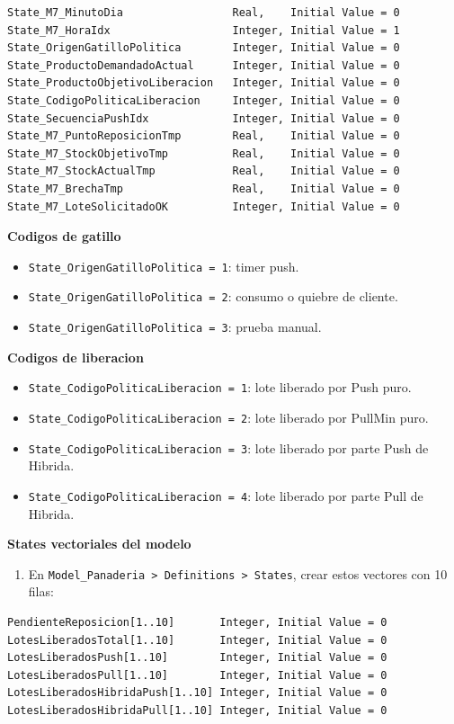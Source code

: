 \documentclass[11pt]{article}
\newcommand{\simio}[1]{\texttt{#1}}
\newcommand{\state}[1]{\texttt{#1}}
\begin{document}
\begin{lstlisting}[caption={States escalares del modelo para M7}]
State_M7_MinutoDia                 Real,    Initial Value = 0
State_M7_HoraIdx                   Integer, Initial Value = 1
State_OrigenGatilloPolitica        Integer, Initial Value = 0
State_ProductoDemandadoActual      Integer, Initial Value = 0
State_ProductoObjetivoLiberacion   Integer, Initial Value = 0
State_CodigoPoliticaLiberacion     Integer, Initial Value = 0
State_SecuenciaPushIdx             Integer, Initial Value = 0
State_M7_PuntoReposicionTmp        Real,    Initial Value = 0
State_M7_StockObjetivoTmp          Real,    Initial Value = 0
State_M7_StockActualTmp            Real,    Initial Value = 0
State_M7_BrechaTmp                 Real,    Initial Value = 0
State_M7_LoteSolicitadoOK          Integer, Initial Value = 0
\end{lstlisting}

\textbf{Codigos de gatillo}
\begin{itemize}
  \item \state{State\_OrigenGatilloPolitica = 1}: timer push.
  \item \state{State\_OrigenGatilloPolitica = 2}: consumo o quiebre de cliente.
  \item \state{State\_OrigenGatilloPolitica = 3}: prueba manual.
\end{itemize}

\textbf{Codigos de liberacion}
\begin{itemize}
  \item \state{State\_CodigoPoliticaLiberacion = 1}: lote liberado por Push puro.
  \item \state{State\_CodigoPoliticaLiberacion = 2}: lote liberado por PullMin puro.
  \item \state{State\_CodigoPoliticaLiberacion = 3}: lote liberado por parte Push de Hibrida.
  \item \state{State\_CodigoPoliticaLiberacion = 4}: lote liberado por parte Pull de Hibrida.
\end{itemize}

\textbf{States vectoriales del modelo}
\begin{enumerate}
  \item En \simio{Model\_Panaderia > Definitions > States}, crear estos vectores con 10 filas:
\end{enumerate}

\begin{lstlisting}[caption={States vectoriales del modelo para M7}]
PendienteReposicion[1..10]       Integer, Initial Value = 0
LotesLiberadosTotal[1..10]       Integer, Initial Value = 0
LotesLiberadosPush[1..10]        Integer, Initial Value = 0
LotesLiberadosPull[1..10]        Integer, Initial Value = 0
LotesLiberadosHibridaPush[1..10] Integer, Initial Value = 0
LotesLiberadosHibridaPull[1..10] Integer, Initial Value = 0
\end{lstlisting}
\end{document}

